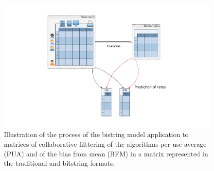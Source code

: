 \documentclass[10pt]{article}
\begin{document}
\begin{figure}[h]
  \centering
  \includegraphics[scale=0.4,trim=5cm 0cm 5cm 0cm,clip]{fig22}
  \caption{Illustration of the process of the bistring model application to 
matrices of collaborative filttering of the 
algorithms per use average (PUA) and of the bias from mean (BFM) in a matrix 
represented in the traditional and 
bitstring formats.}
  \label{fig22}
\end{figure}
\end{document}

